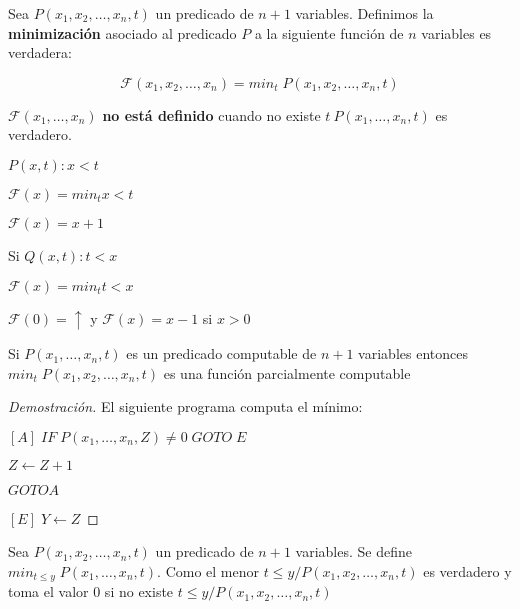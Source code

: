 \begin{definition}
Sea $P(x_1, x_2, \ldots, x_n, t)$ un predicado de $n + 1$ variables. Definimos la \textbf{minimizaci\'on} asociado al predicado $P$ a la siguiente funci\'on de $n$ variables es verdadera:
 
\[
\mathcal{F}(x_1, x_2, \ldots, x_n) = min_{t}\;P(x_1, x_2, \ldots, x_n, t)
\]
 
$\mathcal{F}(x_1, \ldots, x_n)$ \textbf{no est\'a definido} cuando no existe $t \ P(x_1, \ldots, x_n, t)$ es verdadero.
\end{definition}
 
\begin{example}
$P(x, t) \colon x < t$
 
$\mathcal{F}(x) = min_{t} x < t$
 
$\mathcal{F}(x) = x + 1$
 
\end{example}
 
\begin{example}
Si $Q(x, t) \colon t < x$
 
$\mathcal{F}(x) = min_{t} t < x$
 
$\mathcal{F}(0) = \uparrow$ y $\mathcal{F}(x) = x - 1$ si $x > 0$
 
\end{example}
 
\begin{proposition}
Si $P(x_1, \ldots, x_n, t)$ es un predicado computable de $n + 1$ variables entonces $min_{t}\;P(x_1, x_2, \ldots, x_n, t)$ es una funci\'on parcialmente computable
\end{proposition}
 
\begin{proof}[Demostraci\'on]
El siguiente programa computa el m\'inimo:
 
$[A]\;IF\;P(x_1, \ldots, x_n, Z) \neq 0 \; GOTO \; E$
 
$Z \leftarrow Z + 1$
 
$GOTO A$
 
$[E]\; Y \leftarrow Z$
\end{proof}
 
\begin{definition}
Sea $P(x_1, x_2, \ldots, x_n, t)$ un predicado de $n + 1$ variables. Se define $min_{t \leq y}\;P(x_1, \ldots, x_n, t)$. Como el menor $t \leq y / P(x_1, x_2, \ldots, x_n, t)$ es verdadero y toma el valor $0$ si no existe $t \leq y / P(x_1, x_2, \ldots, x_n, t)$
\end{definition}
 
